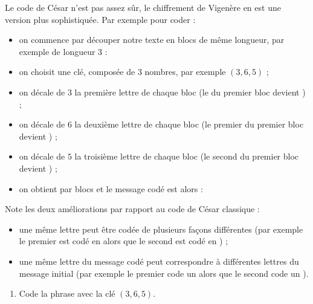 \documentclass[class=report,crop=false, 12pt]{standalone}
\begin{document}
\begin{activite}
Le code de César n'est pas assez sûr, le chiffrement de Vigenère en est une version plus sophistiquée. Par exemple pour coder : 

\centerline{}

\begin{itemize}
  \item on commence par découper notre texte en blocs de même longueur, par exemple de longueur $3$ :
  
\centerline{}
 
 \item on choisit une clé, composée de $3$ nombres, par exemple $(3,6,5)$ ;
 
 \item on décale de $3$ la première lettre de chaque bloc (le  du premier bloc devient ) ; 
 
 \item on décale de $6$ la deuxième lettre de chaque bloc (le premier  du premier bloc devient ) ;
 
 \item on décale de $5$ la troisième lettre de chaque bloc (le second  du premier bloc devient ) ;
 
 \item on obtient par blocs  et le message codé est alors :
 
\centerline{}
\end{itemize}

\bigskip

Note les deux améliorations par rapport au code de César classique :
\begin{itemize}
  \item une même lettre peut être codée de plusieurs façons différentes (par exemple le premier 
   est codé en   alors que le second est codé en ) ;
  
  \item une même lettre du message codé peut correspondre à différentes lettres du message initial (par exemple le premier  code un  alors que le second  code un ).
\end{itemize}
 
\bigskip
 

\begin{enumerate}
  \item Code la phrase  avec la clé $(3,6,5)$.
  

\end{enumerate}
\end{activite}
\end{document}

